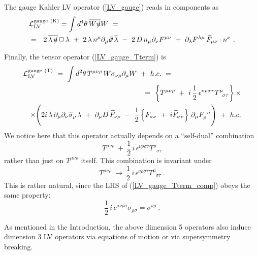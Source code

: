 \documentclass[a4paper,12pt]{article}
\newcommand{\slashed}[1]{\hbox{{$#1$}\llap{$/$}}}
\begin{document}
	The gauge Kahler LV operator (\ref{LV_gauge}) reads in
	components as
\begin{eqnarray}
\label{LV_gauge_comp}
\lefteqn{
	\mathcal{L}_{\mathrm{LV}}^{\mathrm{gauge\ (K)}} =  
	\int d^4\theta \, \overline{W \slashed{n}}W ~=~
	} \\
\nonumber
	& = &
	2\, \overline{\lambda\,\slashed{n}}\, \Box\, 
	   \lambda 
	~+~
	2\, \lambda\, n^\mu \partial_\mu \slashed{\partial}\, 
	   \overline{\lambda} 
	~-~ 
	2\, D\, n_\mu \partial_\nu F^{\mu\nu}
	~+~ 
	\partial_\lambda F^{\lambda\mu}\, 
	\widetilde{F}_{\mu\nu} \cdot n^\nu
	~.
\end{eqnarray}

	Finally, the tensor operator (\ref{LV_gauge_Tterm}) is
\begin{eqnarray}
\nonumber
\lefteqn{
	\mathcal{L}_{\mathrm{LV}}^{\mathrm{gauge\ (T)}}  ~=~ 
	\int d^2\theta \, T^{\mu\nu\rho} \,
	        W \sigma_{\nu\rho} \partial_\mu W  ~+~ h.c. ~=~ } \\
	&&
\label{LV_gauge_Tterm_comp}	
	\quad
	=~
	\left\{ T^{\mu\nu\rho} 
		~+~ 
	       i\,\frac{1}{2}\,\epsilon^{\nu\rho\sigma\tau}
	       T^\mu_{\phantom{\mu}\sigma\tau} \right\} \times 
	\\
\nonumber
	&&
	\times
	\Biggl(
	     2i\, \overline{\lambda}\, \partial_\mu\partial_\nu
	     \overline{\sigma}_\rho\, \lambda 
		~+~
		\partial_\mu D\, \widetilde{F}_{\nu\rho}
		~-~
		\frac{1}{2}
		\left\{
			F_{\sigma\nu} ~+~ 
			i \widetilde{F}_{\sigma\nu}
		\right\}\, 
		\partial_\mu F_\rho^{\phantom{\rho}\sigma}
	\Biggr) 
	~+~ h.c.
\end{eqnarray}
	We notice here that this operator actually depends on
	a ``self-dual'' combination
\[
	T^{\mu\nu\rho} 
	~+~ 
	\frac{1}{2}\,i\,\epsilon^{\nu\rho\sigma\tau}
	T^\mu_{\phantom{\mu}\sigma\tau} 
\]
	rather than just on $ T^{\mu\nu\rho} $ itself. 
	This combination is invariant under
\[
	T^{\mu\nu\rho} 
	~\to~
	\frac{1}{2}\,i\,\epsilon^{\nu\rho\sigma\tau}
	T^\mu_{\phantom{\mu}\sigma\tau} 
	~.
\]
	This is rather natural, since the LHS of 
	(\ref{LV_gauge_Tterm_comp}) obeys the same property:
\[
	\frac{1}{2}\,i\,\epsilon^{\mu\nu\rho\sigma}
		\sigma_{\rho\sigma} = \sigma^{\nu\rho}~.
\]
	
	As mentioned in the Introduction, the above dimension 5 
	operators also induce dimension 3 LV operators via
	equations of motion or via supersymmetry breaking. 
\end{document}
